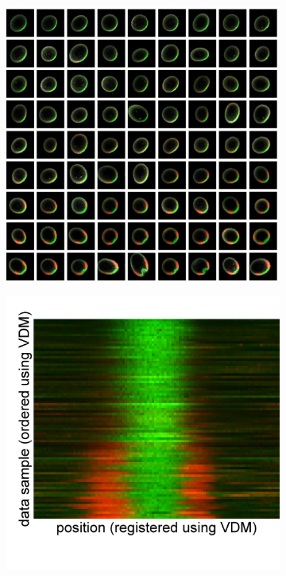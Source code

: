 \documentclass{pnastwo}
\begin{document}
\begin{figure}
\begin{minipage}{0.6\textwidth}
\begin{subfigure}{\textwidth}
\includegraphics[width=\textwidth]{registered_ordered_vdm_2d}
\caption{}
\label{subfig:images_vdm}
\end{subfigure}
\end{minipage}
\begin{minipage}{0.3\textwidth}
\begin{subfigure}{\textwidth}
\includegraphics[width=\textwidth]{registered_ordered_1dfrom2d}

\end{subfigure}
\end{minipage}
\end{figure}
\end{document}
